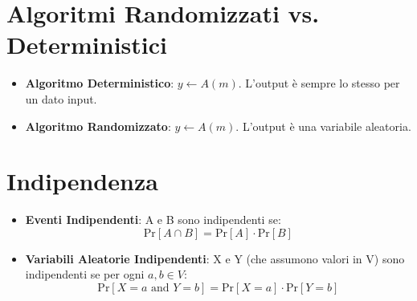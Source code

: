 \section{Algoritmi Randomizzati vs. Deterministici}
\begin{itemize}
    \item \textbf{Algoritmo Deterministico}: $y \leftarrow A(m)$. L'output è sempre lo stesso per un dato input.
    \item \textbf{Algoritmo Randomizzato}: $y \leftarrow A(m)$. L'output è una variabile aleatoria.
\end{itemize}

\section{Indipendenza}
\begin{itemize}
    \item \textbf{Eventi Indipendenti}: A e B sono indipendenti se:
    \[ \text{Pr}[A \cap B] = \text{Pr}[A] \cdot \text{Pr}[B] \]
    \item \textbf{Variabili Aleatorie Indipendenti}: X e Y (che assumono valori in V) sono indipendenti se per ogni $a,b \in V$:
    \[ \text{Pr}[X=a \text{ and } Y=b] = \text{Pr}[X=a] \cdot \text{Pr}[Y=b] \]
\end{itemize}

